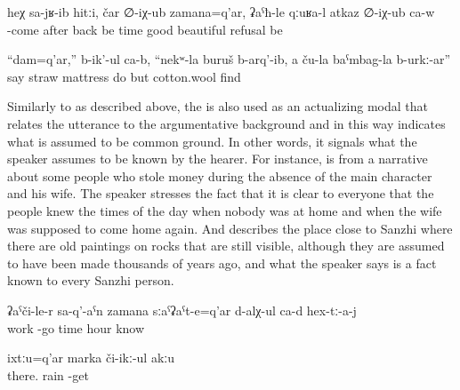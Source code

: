 \begin{exe}
	\ex	\label{ex:‎After he came back, he refused very well minor}
	\gll	heχ	sa-jʁ-ib hitːi,	čar	∅-iχ-ub zamana=q'ar,	ʡaˁħ-le	qːuʁa-l	atkaz	∅-iχ-ub	ca-w\\
			-come	after	back	be	time	good\tsc{-advz}	beautiful	refusal	be	\\
	\glt	{}

	\ex	\label{ex:The (fox) says, For me they made a bed from herbs and grass, and for themselves they took probably cotton wool minor}
	\gll	``dam=q'ar,''	b-ik'-ul	ca-b,	``nekʷ-la	buruš	b-arq'-ib,	a ču-la	baˁmbag-la	b-urkː-ar''\\
			say		straw	mattress	do	but			cotton.wool	find\\
	\glt	{}
\end{exe}

Similarly to  as described above, the   is also used as an actualizing modal  that relates the utterance to the argumentative background and in this way indicates what is assumed to be common ground. In other words, it signals what the speaker assumes to be known by the hearer. For instance,  is from a narrative about some people who stole money during the absence of the main character and his wife. The speaker stresses the fact that it is clear to everyone that the people knew the times of the day when nobody was at home and when the wife was supposed to come home again. And  describes the place close to Sanzhi where there are old paintings on rocks that are still visible, although they are assumed to have been made thousands of years ago, and what the speaker says is a fact known to every Sanzhi person.

\begin{exe}
	\ex	\label{ex:‎‎‎They know the time when (the wife) comes back from work minor}
	\gll	ʡaˁči-le-r	sa-q'-aˁn	zamana	sːaˁʡaˁt-e=q'ar	d-alχ-ul ca-d	hex-tː-a-j\\
		work	-go	time	hour	know		\\
	\glt	{}

	\ex	\label{ex:The rain does not reach there minor}
	\gll	ixtːu=q'ar	marka	či-ikː-ul	akːu\\
		there.	rain	-get	\\
	\glt	{}
\end{exe}


